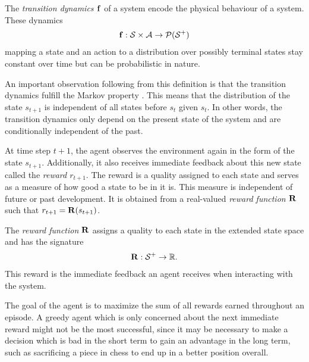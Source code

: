 \begin{definition}
    The \emph{transition dynamics $\operatorname{\mathbf{f}}$} of a system encode the physical behaviour of a system.
    These dynamics
    \begin{align}
        \operatorname{\mathbf{f}} : \mathcal{S} \times \mathcal{A} \to \operatorname{\mathcal{P}}(\mathcal{S}^+)
    \end{align}
    mapping a state and an action to a distribution over possibly terminal states stay constant over time but can be probabilistic in nature.
\end{definition}
An important observation following from this definition is that the transition dynamics fulfill the Markov property \cite{sutton_reinforcement_1998}.
This means that the distribution of the state $s_{t+1}$ is independent of all states before $s_t$ given $s_t$.
In other words, the transition dynamics only depend on the present state of the system and are conditionally independent of the past.

At time step $t+1$, the agent observes the environment again in the form of the state $s_{t+1}$.
Additionally, it also receives immediate feedback about this new state called the \emph{reward $r_{t+1}$}.
The reward is a quality assigned to each state and serves as a measure of how good a state to be in it is.
This measure is independent of future or past development.
It is obtained from a real-valued \emph{reward function $\operatorname{\mathbf{R}}$} such that $r_{t+1} = \operatorname{\mathbf{R}}(s_{t+1})$.
\begin{definition}
    The \emph{reward function $\operatorname{\mathbf{R}}$} assigns a quality to each state in the extended state space and has the signature
    \begin{align}
        \operatorname{\mathbf{R}} : \mathcal{S}^+ \to \mathbb{R}.
    \end{align}
    This reward is the immediate feedback an agent receives when interacting with the system.
\end{definition}

The goal of the agent is to maximize the sum of all rewards earned throughout an episode.
A greedy agent which is only concerned about the next immediate reward might not be the most successful, since it may be necessary to make a decision which is bad in the short term to gain an advantage in the long term, such as sacrificing a piece in chess to end up in a better position overall.

